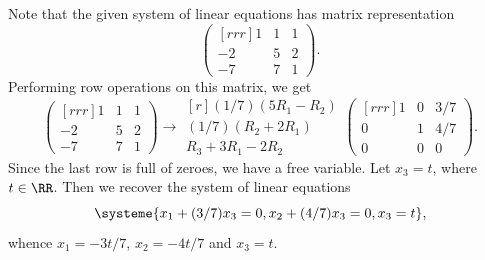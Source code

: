 \begin{solution}
\begin{ppart}
        Note that the given system of linear equations has matrix representation \[\begin{pmatrix}[rrr]1 & 1 & 1 \\ -2 & 5 & 2 \\ -7 & 7 & 1\end{pmatrix}.\] Performing row operations on this matrix, we get \[\begin{pmatrix}[rrr]1 & 1 & 1 \\ -2 & 5 & 2 \\ -7 & 7 & 1\end{pmatrix} \rightarrow \begin{matrix}[r] \scriptstyle (1/7)(5R_1 - R_2) \\ \scriptstyle (1/7)(R_2 + 2R_1) \\ \scriptstyle R_3 + 3R_1 - 2R_2 \end{matrix}\begin{pmatrix}[rrr]1 & 0 & 3/7 \\ 0 & 1 & 4/7 \\ 0 & 0 & 0\end{pmatrix}.\] Since the last row is full of zeroes, we have a free variable. Let $x_3 = t$, where $t \in \RR$. Then we recover the system of linear equations \[\systeme{x_1 + (3/7) x_3 = 0, x_2 + (4/7) x_3 = 0, x_3 = t},\] whence $x_1 = -3t/7$, $x_2 = -4t/7$ and $x_3 = t$.
    \end{ppart}
\end{solution}


